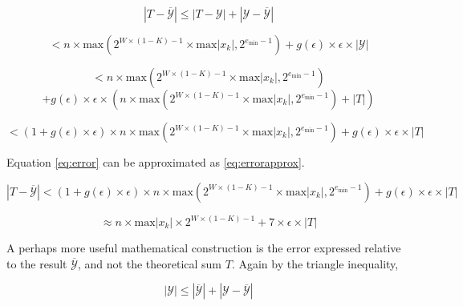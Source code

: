 \documentclass[12pt]{article}
\providecommand{\min}{\ensuremath{\text{min}}}
\providecommand{\max}{\ensuremath{\text{max}}}
\theoremstyle{definition}
\numberwithin{equation}{section}
\numberwithin{figure}{section}
\begin{document}
    \begin{equation*}
      |T - \overline{\mathcal{Y}}| \leq |T - \mathcal{Y}| + |\mathcal{Y} - \overline{\mathcal{Y}}|
    \end{equation*}

    \begin{equation*}
      < n \times \max(2^{W \times (1 - K) - 1} \times \max|x_k|, 2^{e_{\min} - 1}) + g(\epsilon)\times \epsilon\times |\mathcal{Y}|
    \end{equation*}

    \begin{equation*}
      < n \times \max(2^{W \times (1 - K) - 1} \times \max|x_k|, 2^{e_{\min} - 1})
    \end{equation*}
    \begin{equation*}
      + g(\epsilon)\times \epsilon\times (n \times \max(2^{W \times (1 - K) - 1} \times \max|x_k|, 2^{e_{\min} - 1}) + |T|)
    \end{equation*}

    \begin{equation}
      < (1 + g(\epsilon)\times\epsilon) \times n \times \max(2^{W \times (1 - K) - 1} \times \max|x_k|, 2^{e_{\min} - 1}) + g(\epsilon)\times\epsilon\times |T|
      \label{eq:error}
    \end{equation}

    Equation \eqref{eq:error} can be approximated as \eqref{eq:errorapprox}.

    \begin{equation*}
      |T - \overline{\mathcal{Y}}| < (1 + g(\epsilon)\times\epsilon) \times n \times \max(2^{W \times (1 - K) - 1} \times \max|x_k|, 2^{e_{\min} - 1}) + g(\epsilon)\times\epsilon\times|T|
    \end{equation*}

    \begin{equation}
    \approx n \times \max|x_k|\times 2^{W \times (1 - K) - 1} + 7 \times \epsilon \times|T|
      \label{eq:errorapprox}
    \end{equation}

    A perhaps more useful mathematical construction is the error expressed relative to the result $\overline{\mathcal{Y}}$, and not the theoretical sum $T$. Again by the triangle inequality,

    \begin{equation*}
      |\mathcal{Y}| \leq |\overline{\mathcal{Y}}| + |\mathcal{Y} - \overline{\mathcal{Y}}|
    \end{equation*}
\end{document}
